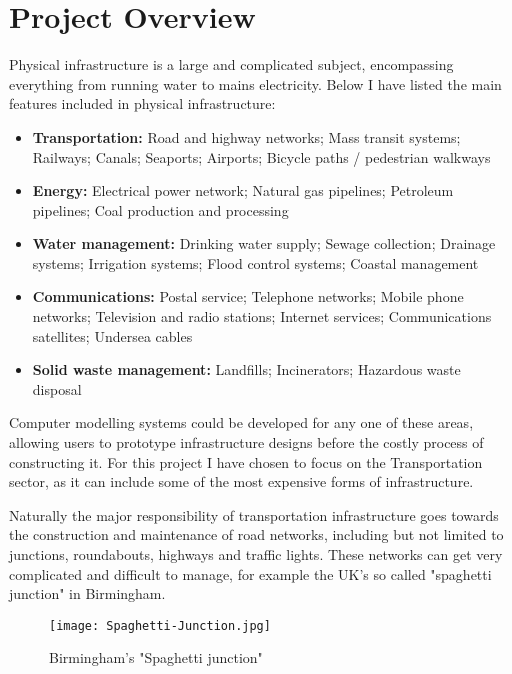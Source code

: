 \section{Project Overview}

    Physical infrastructure is a large and complicated subject, encompassing everything from running water to mains electricity. Below I have listed the main features included in physical infrastructure:

    \begin{itemize}
        \item \textbf{Transportation:} Road and highway networks; Mass transit systems; Railways; Canals; Seaports; Airports; Bicycle paths / pedestrian walkways

        \item \textbf{Energy:} Electrical power network; Natural gas pipelines; Petroleum pipelines; Coal production and processing

        \item \textbf{Water management:} Drinking water supply; Sewage collection; Drainage systems; Irrigation systems; Flood control systems; Coastal management

        \item \textbf{Communications:} Postal service; Telephone networks; Mobile phone networks; Television and radio stations; Internet services; Communications satellites; Undersea cables

        \item \textbf{Solid waste management:} Landfills; Incinerators; Hazardous waste disposal
    \end{itemize}

    Computer modelling systems could be developed for any one of these areas, allowing users to prototype infrastructure designs before the costly process of constructing it. For this project I have chosen to focus on the Transportation sector, as it can include some of the most expensive forms of infrastructure.

    Naturally the major responsibility of transportation infrastructure goes towards the construction and maintenance of road networks, including but not limited to junctions, roundabouts, highways and traffic lights.
    These networks can get very complicated and difficult to manage, for example the UK's so called "spaghetti junction" in Birmingham.

    \begin{figure}[h]
        \texttt{[image: Spaghetti-Junction.jpg]}
        \centering
        \caption{Birmingham's "Spaghetti junction" \cite{Spaghetti-Junction}}
    \end{figure}


